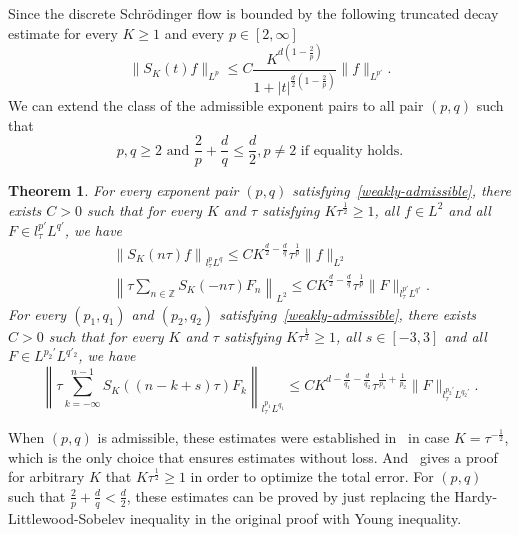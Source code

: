 \documentclass[10pt,a4paper]{article}
\newtheorem{theorem}{Theorem}[section]
\begin{document}
  Since the discrete Schr\"odinger flow is bounded by the following truncated
  decay estimate for every \(K\geq 1\) and every \(p \in [2,\infty]\)
  \[
    \|S_K(t)f\|_{L^p} \leq C \frac{K^{d(1-\frac2p)}}{1+|t|^{\frac{d}2(1-\frac2p)}} \|f\|_{L^{p'}}.
  \]
  We can extend the class of the admissible exponent pairs to all pair \((p,q)\)
  such that 
  \begin{equation}\label{weakly-admissible}
    p,q \geq 2 \text{ and } \frac2p + \frac{d}q \leq \frac{d}2, p \neq 2 \text{ if
    equality holds.}
  \end{equation}

  \begin{theorem}\label{thmDSE} %
    For every exponent pair \((p,q)\) satisfying~\eqref{weakly-admissible}, there exists \(C>0\) such that
    for every \(K\) and \(\tau\) satisfying \(K\tau^\frac12 \geq 1\), all \(
    f \in L^2 \) and all \(F \in l^{p'}_\tau L^{q'}\), we have 
    \begin{eqnarray}
      \label{T} & & \left\| S_{K}(n \tau) f\right\|_{l^p_\tau L^q} \leq C K^{\frac{d}2-\frac{d}q} \tau^\frac1p \|f\|_{L^2} \\
      \label{T*} & & \left\| \tau\sum_{n \in \mathbb{Z}}  S_K (-n\tau) F_n \right\|_{L^2} 
      \leq C K^{\frac{d}2-\frac{d}q} \tau^\frac1p \|F\|_{l^{p'}_\tau L^{q'}}.
    \end{eqnarray}
    For every \((p_1, q_1)\) and \((p_2, q_2)\) satisfying~\eqref{weakly-admissible},
    there exists \(C > 0\) such that for every \(K\) and \(\tau\) 
    satisfying \(K\tau^\frac12 \geq 1\), all \( s \in [-3,3] \) and all 
    \(F \in L^{p_2'} L^{q'_2}\), we have
    \begin{equation}\label{TT*}
      \left\| \tau \sum_{k = -\infty}^{n-1}  S_K ((n-k+s)\tau) F_k \right\|_{l^{p_1}_\tau L^{q_1}}
      \leq C K^{d-\frac{d}{q_1}-\frac{d}{q_2}}\tau^{\frac1{p_1}+\frac1{p_2}} \|F\|_{l^{p_2'}_\tau L^{q_2'}}.
    \end{equation}
  \end{theorem}

  When \((p,q)\) is admissible, these estimates were established in~\cite{IgZz09} 
  in case \(K=\tau^{-\frac12}\), which is the only choice that ensures estimates 
  without loss. And~\cite{ORS21} gives a proof for arbitrary \(K\) that \(K\tau^\frac12 \geq 1\) 
  in order to optimize the total error. For \((p,q)\) such that \(\frac2p + \frac{d}q < \frac{d}2\),
  these estimates can be proved by just replacing the Hardy-Littlewood-Sobelev 
  inequality in the original proof with Young inequality.
\end{document}
